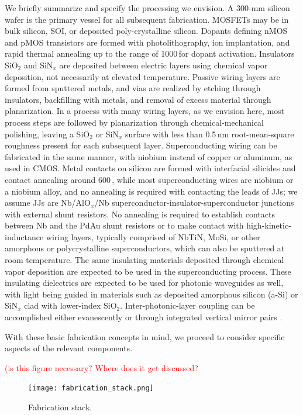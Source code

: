\documentclass[twocolumn]{article}
\begin{document}
We briefly summarize and specify the processing we envision. A 300-mm silicon wafer is the primary vessel for all subsequent fabrication. MOSFETs may be in bulk silicon, SOI, or deposited poly-crystalline silicon. Dopants defining nMOS and pMOS transistors are formed with photolithography, ion implantation, and rapid thermal annealing up to the range of 1000\,\textcelsius for dopant activation. Insulators SiO$_2$ and SiN$_x$ are deposited between electric layers using chemical vapor deposition, not necessarily at elevated temperature. Passive wiring layers are formed from sputtered metals, and vias are realized by etching through insulators, backfilling with metals, and removal of excess material through planarization. In a process with many wiring layers, as we envision here, most process steps are followed by planarization through chemical-mechanical polishing, leaving a SiO$_2$ or SiN$_x$ surface with less than 0.5\,nm root-mean-square roughness present for each subsequent layer. Superconducting wiring can be fabricated in the same manner, with niobium instead of copper or aluminum, as used in CMOS. Metal contacts on silicon are formed with interfacial silicides and contact annealing around 600\,\textcelsius, while most superconducting wires are niobium or a niobium alloy, and no annealing is required with contacting the leads of JJs; we assume JJs are Nb/AlO$_x$/Nb superconductor-insulator-superconductor junctions with external shunt resistors. No annealing is required to establish contacts between Nb and the PdAu shunt resistors or to make contact with high-kinetic-inductance wiring layers, typically comprised of NbTiN, MoSi, or other amorphous or polycrystalline superconductors, which can also be sputtered at room temperature. The same insulating materials deposited through chemical vapor deposition are expected to be used in the superconducting process. These insulating dielectrics are expected to be used for photonic waveguides as well, with light being guided in materials such as deposited amorphous silicon (a-Si) or SiN$_x$ clad with lower-index SiO$_2$. Inter-photonic-layer coupling can be accomplished either evanescently \cite{} or through integrated vertical mirror pairs \cite{}.

With these basic fabrication concepts in mind, we proceed to consider specific aspects of the relevant components. 

\textcolor{red}{(is this figure necessary? Where does it get discussed?}
\begin{figure}
    \centering
    \texttt{[image: fabrication\_stack.png]}
    \caption{Fabrication stack.}
    \label{fig:fabrication_stack}
\end{figure}
\end{document}
